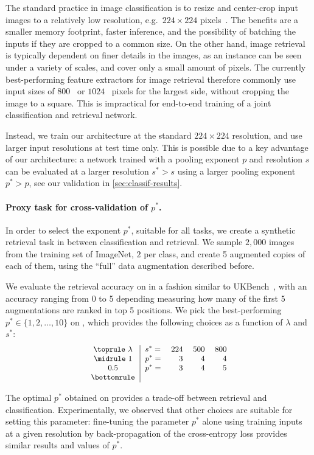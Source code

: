 The standard practice in image classification is to resize and center-crop input images to a relatively low resolution, e.g.~$224\times 224$ pixels~\cite{krizhevsky2012imagenet}. 
%
The benefits are a smaller memory footprint, faster inference, and the possibility of batching the inputs if they are cropped to a common size. On the other hand, image retrieval is typically dependent on finer details in the images, as an instance can be seen under a variety of scales, and cover only a small amount of pixels.
The currently best-performing feature extractors for image retrieval therefore commonly use input sizes of $800$~\cite{Gordo2017EndtoEndLO} or $1024$~\cite{radenovic2018fine} pixels for the largest side, without cropping the image to a square.
This is impractical for end-to-end training of a joint classification and retrieval network.

Instead, we train our architecture at the standard $224\times 224$ resolution, and use larger input resolutions at test time only. 
This is possible due to a key advantage of our architecture:
a network trained with a pooling exponent $p$ and resolution $s$ can be evaluated at a larger resolution $s^*>s$ using a larger pooling exponent $p^*>p$, see our validation in \cref{sec:classif-results}. 

\label{sec:expanding-resolution}
\paragraph{Proxy task for cross-validation of $p^*$.} In order to select the exponent $p^*$, suitable for all tasks, we create a synthetic retrieval task {\bf \inaug} in between classification and retrieval. We sample $2,\!000$ images from the training set of ImageNet, $2$ per class, and create 5 augmented copies of each of them, using the ``full'' data augmentation described before. 

We evaluate the retrieval accuracy on \inaug in a fashion similar to UKBench~\cite{nister2006scalable}, with an accuracy ranging from 0 to 5 depending measuring how many of the first 5 augmentations are ranked in top 5 positions. 
We pick the best-performing $p^* \in \{1, 2,\ldots, 10\}$ on \inaug, 
which provides the following choices as a function of $\lambda$ and $s^*$:
%
\begin{equation*}
{\small
\begin{tabular}{c|lrrr}
\toprule
$\lambda$ & $s^*=$ & $224$ & $500$ & $800$ \\
\midrule
$1$   & $p^*=$ & $3$ & $4$ & $4$\\
$0.5$ & $p^*=$ & $3$ & $4$ & $5$\\
\bottomrule
\end{tabular}}
\end{equation*}

The optimal $p^*$ obtained on \inaug provides a trade-off between retrieval and classification. Experimentally, we observed that other choices are suitable for setting this parameter: %
fine-tuning the parameter $p^*$ alone using training inputs at a given resolution by back-propagation of the cross-entropy loss provides similar results and values of $p^*$.  


%
